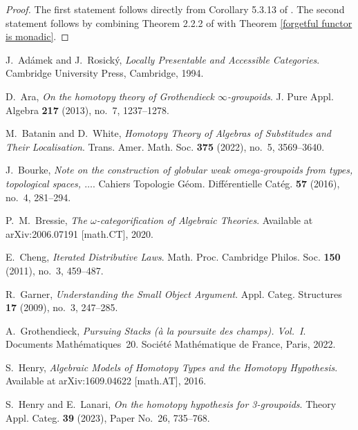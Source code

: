 \documentclass{tac}
\begin{document}
\begin{proof}
The first statement follows directly from Corollary 5.3.13 of \cite{Henry2016}. The second statement follows by combining Theorem 2.2.2 of \cite{BataninWhite2022} with Theorem \ref{forgetful functor is monadic}.
\end{proof}

\begin{references*}

J.~Ad\'{a}mek and J.~Rosick\'{y},
\emph{Locally Presentable and Accessible Categories}.
Cambridge University Press, Cambridge, 1994.

D.~Ara,
\emph{On the homotopy theory of Grothendieck $\infty$-groupoids}.
J. Pure Appl. Algebra \textbf{217} (2013), no.~7, 1237--1278.

M.~Batanin and D.~White,
\emph{Homotopy Theory of Algebras of Substitudes and Their Localisation}.
Trans. Amer. Math. Soc. \textbf{375} (2022), no.~5, 3569--3640.

J.~Bourke,
\emph{Note on the construction of globular weak omega-groupoids from
types, topological spaces, $\ldots$}.
Cahiers Topologie G\'eom. Diff\'erentielle Cat\'eg. \textbf{57}
(2016), no.~4, 281--294.

P.~M.~Bressie,
\emph{The $\omega$-categorification of Algebraic Theories}.
Available at arXiv:2006.07191 [math.CT], 2020.

E.~Cheng,
\emph{Iterated Distributive Laws}.
Math. Proc. Cambridge Philos. Soc.
\textbf{150} (2011), no.~3, 459--487.

R.~Garner,
\emph{Understanding the Small Object Argument}.
Appl. Categ. Structures
\textbf{17} (2009), no.~3, 247--285.

A.~Grothendieck,
\emph{Pursuing Stacks (\`a la poursuite des champs). Vol.~I}.
Documents Math\'ematiques~20.
Soci\'et\'e Math\'ematique de France, Paris, 2022.

S.~Henry,
\emph{Algebraic Models of Homotopy Types and the Homotopy Hypothesis}.
Available at arXiv:1609.04622 [math.AT], 2016.

S.~Henry and E.~Lanari,
\emph{On the homotopy hypothesis for 3-groupoids}.
Theory Appl. Categ.
\textbf{39} (2023), Paper No.~26, 735--768.


\end{references*}
\end{document}
